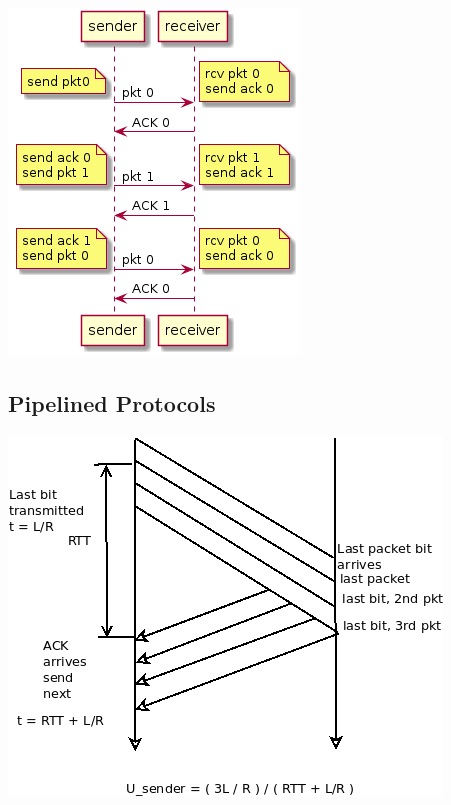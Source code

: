 \documentclass[11pt]{article}
\begin{document}
\begin{center}
\includegraphics[width=.9\linewidth]{RDT3.0.png}
\end{center}



\subsection{Pipelined Protocols}
\label{sec:orga2e8ec4}

\begin{center}
\includegraphics[width=.9\linewidth]{../img/pipelined_protocols.png}
\end{center}
\end{document}
